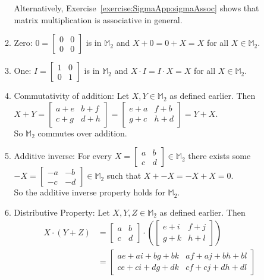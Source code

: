 \begin{enumerate}[(a)]
\begin{enumerate}[(1)]
Alternatively, Exercise~\ref{exercise:SigmaApp:sigmaAssoc} shows that matrix multiplication is associative in general.
\item Zero:  $0=
\begin{bmatrix}
0 & 0\\
0 & 0
\end{bmatrix}$
is in ${\mathbb M}_2$ and $X+0=0+X=X$ for all $X\in{\mathbb M}_2$. 
\item One:  $I=
\begin{bmatrix}
1 & 0\\
0 & 1
\end{bmatrix}$
is in ${\mathbb M}_2$ and $X\cdot I=I\cdot X=X$ for all $X\in{\mathbb M}_2$.
\item Commutativity of addition:  Let $X,Y\in{\mathbb M}_2$ as defined earlier.  Then $X+Y=
\begin{bmatrix}
a+e & b+f\\
c+g & d+h
\end{bmatrix}=
\begin{bmatrix}
e+a & f+b\\
g+c & h+d
\end{bmatrix}
=Y+X$.\\  
So ${\mathbb M}_2$ commutes over addition.
\item Additive inverse:  For every $X=
\begin{bmatrix}
a & b\\
c & d
\end{bmatrix}
\in{\mathbb M}_2$ there exists some $-X=
\begin{bmatrix}
-a & -b\\
-c & -d
\end{bmatrix}
\in{\mathbb M}_2$ such that $X+-X=-X+X=0$.\\  
So the additive inverse property holds for ${\mathbb M}_2$.
\item Distributive Property:  Let $X,Y,Z\in{\mathbb M}_2$ as defined earlier.  Then 
\begin{align*}
X\cdot(Y+Z)&=
\begin{bmatrix}
a & b\\
c & d
\end{bmatrix}
\cdot\left(
\begin{bmatrix}
e+i & f+j\\
g+k & h+l
\end{bmatrix}
\right)\\
&=
\begin{bmatrix}
ae+ai+bg+bk & af+aj+bh+bl\\
ce+ci+dg+dk & cf+cj+dh+dl

\end{bmatrix}
\end{align*}
\end{enumerate}
\end{enumerate}
